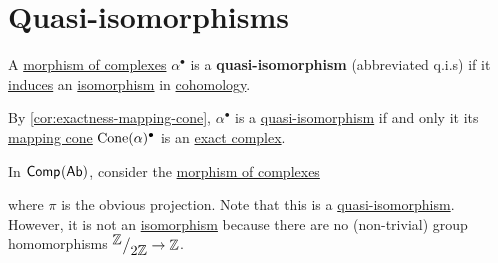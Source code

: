 \documentclass[../../../main]{subfiles}
\begin{document}
\section{Quasi-isomorphisms}

\begin{definition} \label{def:quasi-isomorphism}
  A \hyperref[def:complex-morphism]{morphism of complexes} \(\alpha^{\bullet}\) is a \textbf{quasi-isomorphism} (abbreviated q.i.s) if it \hyperref[thm:LES-in-cohomology]{induces} an \hyperref[def:categorical-isomorphism]{isomorphism} in \hyperref[def:cohomology]{cohomology}.
\end{definition}

\begin{remark}
  By \autoref{cor:exactness-mapping-cone}, \(\alpha^{\bullet}\) is a \hyperref[def:quasi-isomorphism]{quasi-isomorphism} if and only it its \hyperref[def:mapping-cone]{mapping cone} \(\operatorname{Cone}(\alpha)^{\bullet}\) is an \hyperref[def:exact-complex]{exact complex}.
\end{remark}

\begin{example}
  In \(\mathsf{Comp}^{}(\mathsf{Ab})\), consider the \hyperref[def:complex-morphism]{morphism of complexes}
  \begin{center}
  \end{center}
  where \(\pi\) is the obvious projection.
  Note that this is a \hyperref[def:quasi-isomorphism]{quasi-isomorphism}.
  However, it is not an \hyperref[def:categorical-isomorphism]{isomorphism} because there are no (non-trivial) group homomorphisms \({^{\textstyle \mathbb{Z}}\big/_{\textstyle 2\mathbb{Z}}} \to \mathbb{Z}\).
\end{example}
\end{document}
